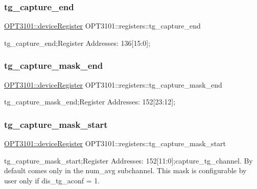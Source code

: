 \subsubsection{\texorpdfstring{tg\+\_\+capture\+\_\+end}{tg\_capture\_end}}
{\footnotesize\ttfamily \mbox{\hyperlink{class_o_p_t3101_1_1device_register}{O\+P\+T3101\+::device\+Register}} O\+P\+T3101\+::registers\+::tg\+\_\+capture\+\_\+end}



tg\+\_\+capture\+\_\+end;Register Addresses\+: 136\mbox{[}15\+:0\mbox{]}; 

\mbox{\label{class_o_p_t3101_1_1registers_ade793e58a1728490c89346e2ecaf2914}} 
\subsubsection{\texorpdfstring{tg\+\_\+capture\+\_\+mask\+\_\+end}{tg\_capture\_mask\_end}}
{\footnotesize\ttfamily \mbox{\hyperlink{class_o_p_t3101_1_1device_register}{O\+P\+T3101\+::device\+Register}} O\+P\+T3101\+::registers\+::tg\+\_\+capture\+\_\+mask\+\_\+end}



tg\+\_\+capture\+\_\+mask\+\_\+end;Register Addresses\+: 152\mbox{[}23\+:12\mbox{]}; 

\mbox{\label{class_o_p_t3101_1_1registers_a943365fa49060742fa49602a1700821c}} 
\subsubsection{\texorpdfstring{tg\+\_\+capture\+\_\+mask\+\_\+start}{tg\_capture\_mask\_start}}
{\footnotesize\ttfamily \mbox{\hyperlink{class_o_p_t3101_1_1device_register}{O\+P\+T3101\+::device\+Register}} O\+P\+T3101\+::registers\+::tg\+\_\+capture\+\_\+mask\+\_\+start}



tg\+\_\+capture\+\_\+mask\+\_\+start;Register Addresses\+: 152\mbox{[}11\+:0\mbox{]};capture\+\_\+tg\+\_\+channel. By default comes only in the num\+\_\+avg subchannel. This mask is configurable by user only if dis\+\_\+tg\+\_\+aconf = \textquotesingle{}1\textquotesingle{}. 

